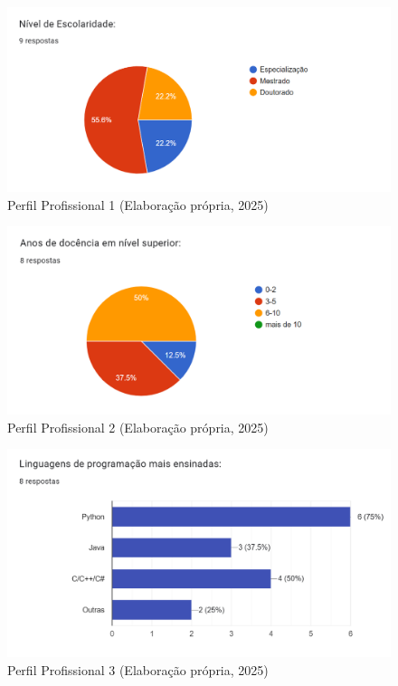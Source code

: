 \begin{figure}[ht]
	\centering
	\includegraphics[width=18cm]{./imagens/capitulo8/1-escolaridade}
	\caption{Perfil Profissional 1 (Elaboração própria, 2025) }
	\label{fig:nivel-escolaridade}
\end{figure}
\begin{figure}[ht]
	\centering
	\includegraphics[width=18cm]{./imagens/capitulo8/2-anos-docencia}
	\caption{Perfil Profissional 2 (Elaboração própria, 2025) }
	\label{fig:anos-docencia}
\end{figure}
\begin{figure}[ht]
	\centering
	\includegraphics[width=18cm]{./imagens/capitulo8/2-linguagens-ensinadas}
	\caption{Perfil Profissional 3 (Elaboração própria, 2025) }
	\label{fig:linguagens-ensinadas}
\end{figure}

